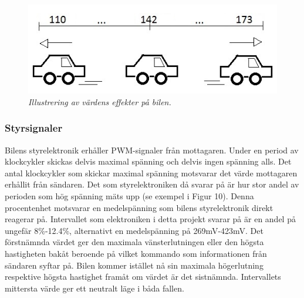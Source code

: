 \documentclass[a4paper]{article}
\begin{document}

\begin{figure}[H]
\includegraphics[scale=1]{110-173Car.jpg}
\centering
\caption{\it Illustrering av värdens effekter på bilen.}
\end{figure} 




\subsubsection{Styrsignaler}

Bilens styrelektronik erhåller PWM-signaler från mottagaren. Under en period av klockcykler skickas delvis maximal spänning och delvis ingen spänning alls. Det antal klockcykler som skickar maximal spänning motsvarar det värde mottagaren erhållit från sändaren. Det som styrelektroniken då svarar på är hur stor andel av perioden som hög spänning mäts upp (se exempel i Figur 10). Denna procentenhet motsvarar en medelspänning som bilens styrelektronik direkt reagerar på. Intervallet som elektroniken i detta projekt svarar på är en andel på ungefär 8\%-12.4\%, alternativt en medelspänning på 269mV-423mV. Det förstnämnda värdet ger den maximala vänsterlutningen eller den högsta hastigheten bakåt beroende på vilket kommando som informationen från sändaren syftar på. Bilen kommer istället nå sin maximala högerlutning respektive högsta hastighet framåt om värdet är det sistnämnda. Intervallets mittersta värde ger ett neutralt läge i båda fallen.
\end{document}
